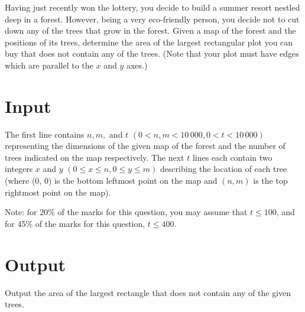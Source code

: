 Having just recently won the lottery, you decide to build a summer resort nestled deep in a forest.
However, being a very eco-friendly person, you decide not to cut down any of the trees that grow in
the forest. Given a map of the forest and the positions of its trees, determine the area of the
largest rectangular plot you can buy that does not contain any of the trees. (Note that your plot
must have edges which are parallel to the $x$ and $y$ axes.)

\section*{Input}
The first line contains $n, m,$ and $t$ $(0 < n, m < 10\,000, 0 < t < 10\,000)$ representing the
dimensions of the given map of the forest and the number of trees indicated on the map respectively.
The next $t$ lines each contain two integers $x$ and $y$ $(0 \le x \le n, 0 \le y \le m)$ describing the
location of each tree (where (0, 0) is the bottom leftmost point on the map and $(n, m)$ is the top
rightmost point on the map).

Note: for 20\% of the marks for this question, you may assume that $t \le 100$, and for 45\% of the
marks for this question, $t \le 400$.

\section*{Output}
Output the area of the largest rectangle that does not contain any of the given trees.
